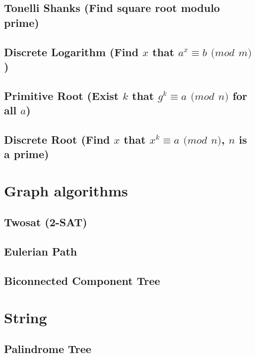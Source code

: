 \subsection{Tonelli Shanks (Find square root modulo prime)}
\raggedbottom
\hrulefill
\subsection{Discrete Logarithm (Find $x$ that $a^x \equiv b$ $(mod$ $m)$)}
\raggedbottom
\hrulefill
\subsection{Primitive Root (Exist $k$ that $g^k \equiv a$ $(mod$ $n)$ for all $a$)}
\raggedbottom
\hrulefill
\subsection{Discrete Root (Find $x$ that $x^k \equiv a$ $(mod$ $n)$, $n$ is a prime)}
\raggedbottom
\hrulefill

\section{Graph algorithms}
\subsection{Twosat (2-SAT)}
\raggedbottom
\hrulefill
\subsection{Eulerian Path}
\raggedbottom
\hrulefill
\subsection{Biconnected Component Tree}
\raggedbottom
\hrulefill

\section{String}
\subsection{Palindrome Tree}
\raggedbottom
\hrulefill

